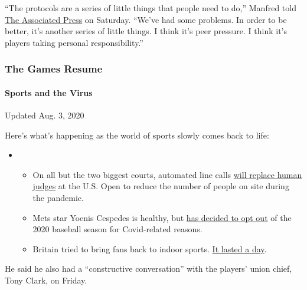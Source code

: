 ``The protocols are a series of little things that people need to do,''
Manfred told
\href{https://apnews.com/eff9d34788720e0b3d6df53c2779fd01}{The
Associated Press} on Saturday. ``We've had some problems. In order to be
better, it's another series of little things. I think it's peer
pressure. I think it's players taking personal responsibility.''

\hypertarget{the-games-resume}{%
\subsubsection{The Games Resume}\label{the-games-resume}}

\hypertarget{sports-and-the-virus}{%
\paragraph{Sports and the Virus}\label{sports-and-the-virus}}

Updated Aug. 3, 2020

Here's what's happening as the world of sports slowly comes back to
life:

\begin{itemize}
\item
  \begin{itemize}
  \tightlist
  \item
    On all but the two biggest courts, automated line calls
    \href{https://www.nytimes.com/2020/08/03/sports/tennis/us-open-hawkeye-line-judges.html?action=click\&pgtype=Article\&state=default\&region=MAIN_CONTENT_2\&context=storylines_keepup}{will
    replace human judges} at the U.S. Open to reduce the number of
    people on site during the pandemic.
  \item
    Mets star Yoenis Cespedes is healthy, but
    \href{https://www.nytimes.com/2020/08/02/sports/baseball/Yoenis-cespedes-opt-out-rule.html?action=click\&pgtype=Article\&state=default\&region=MAIN_CONTENT_2\&context=storylines_keepup}{has
    decided to opt out} of the 2020 baseball season for Covid-related
    reasons.
  \item
    Britain tried to bring fans back to indoor sports.
    \href{https://www.nytimes.com/2020/08/02/sports/snooker-world-championship.html?action=click\&pgtype=Article\&state=default\&region=MAIN_CONTENT_2\&context=storylines_keepup}{It
    lasted a day}.
  \end{itemize}
\end{itemize}

He said he also had a ``constructive conversation'' with the players'
union chief, Tony Clark, on Friday.

